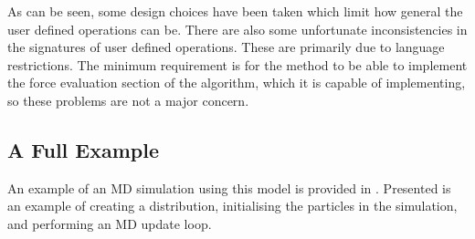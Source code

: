 As can be seen, some design choices have been taken which limit how
general the user defined operations can be.
%
There are also some unfortunate inconsistencies in the signatures of
user defined operations.
%
These are primarily due to language restrictions.
%
The minimum requirement is for the method to be able
to implement the force evaluation section of the \velocityverlet{} algorithm,
which it is capable of implementing,
so these problems are not a major concern.


\subsection{A Full Example}

An example of an MD simulation using this model is provided in
.
%
Presented is an example of creating a distribution,
initialising the particles in the simulation,
and performing an MD update loop.


